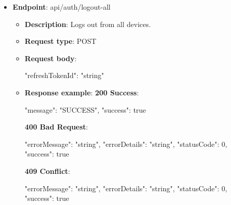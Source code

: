 \begin{itemize}
    \item \textbf{Endpoint}: api/auth/logout-all
    \begin{itemize}
        \item \textbf{Description}: Logs out from all devices.
        \item \textbf{Request type}: POST
        \item \textbf{Request body}:
        \begin{spverbatim}
        {
            "refreshTokenId": "string"
        }
        \end{spverbatim}
        \item  \textbf{Response example}:
        \textbf{200 Success}:
        \begin{spverbatim}
        {
            "message": "SUCCESS",
            "success": true
        }
        \end{spverbatim}
        \textbf{400 Bad Request}:
        \begin{spverbatim}
        {
            "errorMessage": "string",
            "errorDetails": "string",
            "statusCode": 0,
            "success": true
        }
        \end{spverbatim}
        \textbf{409 Conflict}:
        \begin{spverbatim}
        {
            "errorMessage": "string",
            "errorDetails": "string",
            "statusCode": 0,
            "success": true
        }
        \end{spverbatim}
    \end{itemize}

\end{itemize}